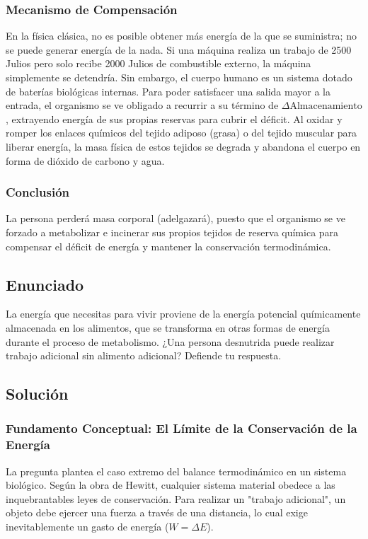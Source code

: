 \documentclass[12pt,a4paper]{article}
\begin{document}
\subsubsection*{Mecanismo de Compensación}
En la física clásica, no es posible obtener más energía de la que se suministra; no se puede generar energía de la nada. Si una máquina realiza un trabajo de 2500 Julios pero solo recibe 2000 Julios de combustible externo, la máquina simplemente se detendría. Sin embargo, el cuerpo humano es un sistema dotado de baterías biológicas internas. Para poder satisfacer una salida mayor a la entrada, el organismo se ve obligado a recurrir a su término de $\Delta\text{Almacenamiento}$, extrayendo energía de sus propias reservas para cubrir el déficit. Al oxidar y romper los enlaces químicos del tejido adiposo (grasa) o del tejido muscular para liberar energía, la masa física de estos tejidos se degrada y abandona el cuerpo en forma de dióxido de carbono y agua.

\subsubsection*{Conclusión}
La persona perderá masa corporal (adelgazará), puesto que el organismo se ve forzado a metabolizar e incinerar sus propios tejidos de reserva química para compensar el déficit de energía y mantener la conservación termodinámica.

\newpage
\subsection*{Enunciado}
La energía que necesitas para vivir proviene de la energía potencial químicamente almacenada en los alimentos, que se transforma en otras formas de energía durante el proceso de metabolismo. ¿Una persona desnutrida puede realizar trabajo adicional sin alimento adicional? Defiende tu respuesta.

\subsection*{Solución}

\subsubsection*{Fundamento Conceptual: El Límite de la Conservación de la Energía}
La pregunta plantea el caso extremo del balance termodinámico en un sistema biológico. Según la obra de Hewitt, cualquier sistema material obedece a las inquebrantables leyes de conservación. Para realizar un "trabajo adicional", un objeto debe ejercer una fuerza a través de una distancia, lo cual exige inevitablemente un gasto de energía ($W = \Delta E$).
\end{document}
